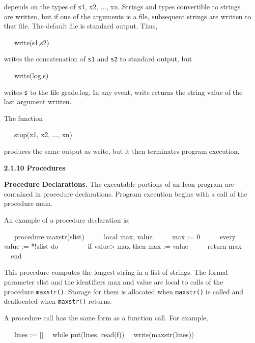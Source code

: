 \noindent depends on the types of x1, x2, ..., xn. Strings and types
convertible to strings are written, but if one of the arguments is a
file, subsequent strings are written to that file. The default file is
standard output. Thus,

{\ttfamily\mdseries
\ \ \ write(s1,s2)}

\noindent
writes the concatenation of \texttt{s1} and \texttt{s2} to standard output, but

{\ttfamily\mdseries
\ \ \ write(log,s)}

\noindent
writes \texttt{s} to the file grade.log. In any event, write returns
the string value of the last argument written.

The function

{\ttfamily\mdseries
\ \ \ stop(x1, x2, ..., xn)}

\noindent
produces the same output as write, but it then terminates program execution.

{\sffamily\bfseries
2.1.10 Procedures}

\textbf{Procedure Declarations.} The executable portions of an Icon
program are contained in procedure declarations.  Program execution
begins with a call of the procedure main.

An example of a procedure declaration is:

{\ttfamily\mdseries
\ \ \ procedure maxstr(slist)\newline
 \ \ \ \ \ local max, value\newline
 \ \ \ \ \ max := 0\newline
 \ \ \ \ \ every value := *!slist do\newline
 \ \ \ \ \ \ \ \ if value{\textgreater} max then max := value\newline
 \ \ \ \ \ return max\newline
 \ \ end}


This procedure computes the longest string in a list of strings. The
formal parameter slist and the identifiers max and value are local to
calls of the procedure \texttt{maxstr()}. Storage for them is
allocated when \texttt{maxstr()} is called and deallocated when
\texttt{maxstr()} returns.

A procedure call has the same form as a function call. For example,

{\ttfamily\mdseries
\ \ \ lines := []\newline
 \ \ while put(lines, read(f))\newline
 \ \ write(maxstr(lines))}

